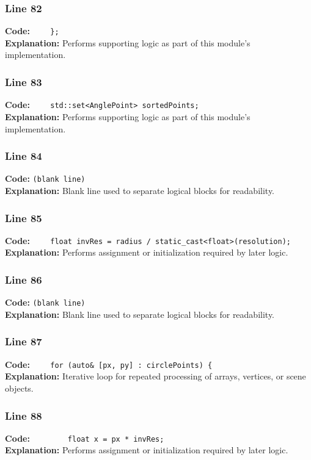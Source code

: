 \documentclass[11pt,a4paper]{article}
\begin{document}
\subsubsection*{Line 82}
\textbf{Code:} \verb|    };|\\
\textbf{Explanation:} Performs supporting logic as part of this module's implementation.

\subsubsection*{Line 83}
\textbf{Code:} \verb|    std::set<AnglePoint> sortedPoints;|\\
\textbf{Explanation:} Performs supporting logic as part of this module's implementation.

\subsubsection*{Line 84}
\textbf{Code:} \texttt{(blank line)}\\
\textbf{Explanation:} Blank line used to separate logical blocks for readability.

\subsubsection*{Line 85}
\textbf{Code:} \verb|    float invRes = radius / static_cast<float>(resolution);|\\
\textbf{Explanation:} Performs assignment or initialization required by later logic.

\subsubsection*{Line 86}
\textbf{Code:} \texttt{(blank line)}\\
\textbf{Explanation:} Blank line used to separate logical blocks for readability.

\subsubsection*{Line 87}
\textbf{Code:} \verb|    for (auto& [px, py] : circlePoints) {|\\
\textbf{Explanation:} Iterative loop for repeated processing of arrays, vertices, or scene objects.

\subsubsection*{Line 88}
\textbf{Code:} \verb|        float x = px * invRes;|\\
\textbf{Explanation:} Performs assignment or initialization required by later logic.
\end{document}
